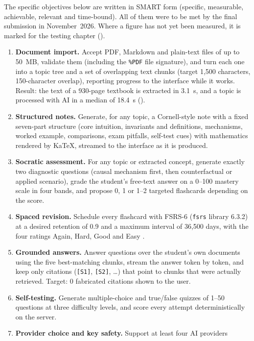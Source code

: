 The specific objectives below are written in SMART form (specific, measurable,
achievable, relevant and time-bound). All of them were to be met by the final
submission in November~2026. Where a figure has not yet been measured, it is marked for
the testing chapter ().

\begin{enumerate}
  \item \textbf{Document import.} Accept PDF, Markdown and plain-text files of up to
  50~MB, validate them (including the \texttt{\%PDF} file signature), and turn each one
  into a topic tree and a set of overlapping text chunks (target 1{,}500 characters,
  150-character overlap), reporting progress to the interface while it works. Result: the text of a 930-page textbook is
  extracted in 3.1~s, and a topic is processed with AI in a median of 18.4~s ().
  \item \textbf{Structured notes.} Generate, for any topic, a Cornell-style note with a
  fixed seven-part structure (core intuition, invariants and definitions, mechanisms,
  worked example, comparisons, exam pitfalls, self-test cues) with mathematics rendered
  by KaTeX, streamed to the interface as it is produced.
  \item \textbf{Socratic assessment.} For any topic or extracted concept, generate
  exactly two diagnostic questions (causal mechanism first, then counterfactual or
  applied scenario), grade the student's free-text answer on a 0--100 mastery scale in
  four bands, and propose 0, 1 or 1--2 targeted flashcards depending on the score.
  \item \textbf{Spaced revision.} Schedule every flashcard with FSRS-6 (\texttt{fsrs}
  library 6.3.2) at a desired retention of 0.9 and a maximum interval of 36{,}500
  days, with the four ratings Again, Hard, Good and Easy \cite{ye2022fsrs,pyfsrs}.
  \item \textbf{Grounded answers.} Answer questions over the student's own documents
  using the five best-matching chunks, stream the answer token by token, and keep only
  citations (\texttt{[S1]}, \texttt{[S2]}, \ldots) that point to chunks that were
  actually retrieved. Target: 0 fabricated citations shown to the user.
  \item \textbf{Self-testing.} Generate multiple-choice and true/false quizzes of 1--50
  questions at three difficulty levels, and score every attempt deterministically on
  the server.
  \item \textbf{Provider choice and key safety.} Support at least four AI providers

\end{enumerate}

